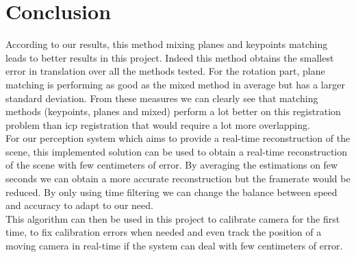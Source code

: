
\chapter{Conclusion}

According to our results, this method mixing planes and keypoints matching leads to better results in this project. Indeed this method obtains the smallest error in translation over all the methods tested. For the rotation part, plane matching is performing as good as the mixed method in average but has a larger standard deviation. 
From these measures we can clearly see that matching methods (keypoints, planes and mixed) perform a lot better on this registration problem than \acrshort{icp} registration that would require a lot more overlapping. \\
For our perception system which aims to provide a real-time reconstruction of the scene, this implemented solution can be used to obtain a real-time reconstruction of the scene with few centimeters of error. By averaging the estimations on few seconds we can obtain a more accurate reconstruction but the framerate would be reduced. By only using time filtering we can change the balance between speed and accuracy to adapt to our need. \\
This algorithm can then be used in this project to calibrate camera for the first time, to fix calibration errors when needed and even track the position of a moving camera in real-time if the system can deal with few centimeters of error.